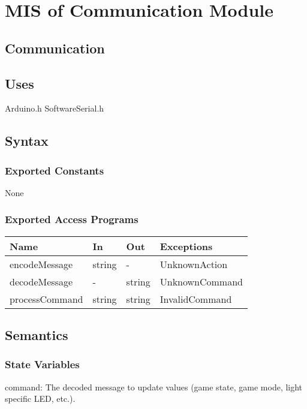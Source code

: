 \documentclass[12pt, titlepage]{article}
\begin{document}
\newpage


\section{MIS of Communication Module} \label{CommunicationModule}

\subsection{Communication}

\subsection{Uses}
Arduino.h
SoftwareSerial.h

\subsection{Syntax}

\subsubsection{Exported Constants}{
  None
}

\subsubsection{Exported Access Programs}{
  \begin{center}
  \begin{tabular}{p{4cm} p{2cm} p{2cm} p{4cm}}
  \hline
  \textbf{Name} & \textbf{In} & \textbf{Out} & \textbf{Exceptions} \\
  \hline
  encodeMessage & string & - & UnknownAction \\
  \midrule
  decodeMessage & - & string & UnknownCommand \\
  \midrule
  processCommand & string & string & InvalidCommand \\
  \hline
  \end{tabular}
  \end{center}
}

\subsection{Semantics}

\subsubsection{State Variables}{
  command: The decoded message to update values (game state, game mode, light specific LED, etc.).\\
}
\end{document}
